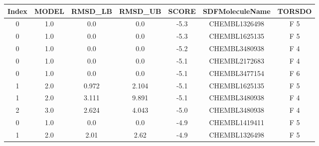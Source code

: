 \documentclass[10pt]{article}
\begin{document}
    \begin{center}
        \begin{tabular}{ c|c|c|c|c|c|c }
            Index & MODEL & RMSD\_LB & RMSD\_UB & SCORE & SDFMoleculeName & TORSDO \\
            \hline
            0     & 1.0   & 0.0      & 0.0      & -5.3  & CHEMBL1326498   & F 5    \\
            0     & 1.0   & 0.0      & 0.0      & -5.3  & CHEMBL1625135   & F 5    \\
            0     & 1.0   & 0.0      & 0.0      & -5.2  & CHEMBL3480938   & F 4    \\
            0     & 1.0   & 0.0      & 0.0      & -5.1  & CHEMBL2172683   & F 4    \\
            0     & 1.0   & 0.0      & 0.0      & -5.1  & CHEMBL3477154   & F 6    \\
            1     & 2.0   & 0.972    & 2.104    & -5.1  & CHEMBL1625135   & F 5    \\
            1     & 2.0   & 3.111    & 9.891    & -5.1  & CHEMBL3480938   & F 4    \\
            2     & 3.0   & 2.624    & 4.043    & -5.0  & CHEMBL3480938   & F 4    \\
            0     & 1.0   & 0.0      & 0.0      & -4.9  & CHEMBL1419411   & F 5    \\
            1     & 2.0   & 2.01     & 2.62     & -4.9  & CHEMBL1326498   & F 5
        \end{tabular}
    \end{center}


\end{document}
